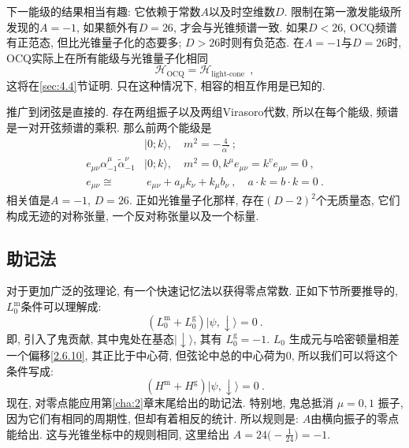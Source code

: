 下一能级的结果相当有趣: 它依赖于常数$A$以及时空维数$D$. 限制在第一激发能级所发现的$A=-1$, 如果额外有$D=26$, 才会与光锥频谱一致. 如果$D<26$, OCQ频谱有正范态, 但比光锥量子化的态要多; $D>26$时则有负范态. 在$A=-1$与$D=26$时, OCQ实际上在所有能级与光锥量子化相同
\begin{equation}
\mathscr{H}_{\mathrm{OCQ}}=\mathscr{H}_{\text {light-cone }} \:, \label{4.1.20}
\end{equation}
这将在\ref{sec:4.4}节证明. 只在这种情况下, 相容的相互作用是已知的.

推广到闭弦是直接的. 存在两组振子以及两组Virasoro代数, 所以在每个能级, 频谱是一对开弦频谱的乘积. 那么前两个能级是 
\begin{subequations} \label{4.1.21}
\begin{align}
&|0 ; k\rangle, \quad m^{2}=-\frac{4}{\alpha^{\prime}} \:; \label{4.1.21a}\\
e_{\mu \nu} \alpha_{-1}^{\mu} \tilde{\alpha}_{-1}^{\nu} &|0 ; k\rangle, \quad m^{2}=0, k^{\mu} e_{\mu \nu}=k^{v} e_{\mu \nu}=0 \:, \label{4.1.21b}\\
e_{\mu \nu} \cong &\: e_{\mu \nu}+a_{\mu} k_{\nu}+k_{\mu} b_{\nu}\:,\quad  a \cdot k=b \cdot k=0 \:.\label{4.1.21c}
\end{align}
\end{subequations}
相关值是$A=-1$, $D=26$. 正如光锥量子化那样, 存在$(D-2)^{2}$个无质量态, 它们构成无迹的对称张量, 一个反对称张量以及一个标量.

\subsection*{助记法}
对于更加广泛的弦理论, 有一个快速记忆法以获得零点常数. 正如下节所要推导的, $L_0^{\mathrm{m}}$条件可以理解成: 
\begin{equation}\label{4.1.22}
(L_{0}^{\mathrm{m}}+L_{0}^{\mathrm{g}})|\psi, \downarrow\rangle=0 \:. 
\end{equation}
即, 引入了鬼贡献, 其中鬼处在基态$\lvert\downarrow\rangle$, 其有 $L_{0}^{\mathrm{g}}=-1$.  $L_{0}$ 生成元与哈密顿量相差一个偏移\eqref{2.6.10}, 其正比于中心荷, 但弦论中总的中心荷为0, 所以我们可以将这个条件写成: 
\begin{equation}
(H^{\mathrm{m}}+H^{\mathrm{g}})|\psi, \downarrow\rangle=0 \:. \label{4.1.23}
\end{equation}
现在, 对零点能应用第\ref{cha:2}章末尾给出的助记法. 特别地, 鬼总抵消 $\mu=0,1$ 振子, 因为它们有相同的周期性, 但却有着相反的统计. 所以规则是: $A$由横向振子的零点能给出. 这与光锥坐标中的规则相同, 这里给出 $A=24\bigl(-\frac{1}{24}\bigr)=-1$.

